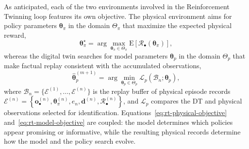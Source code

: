 \documentclass[journal]{IEEEtran}
\begin{document}
As anticipated, each of the two environments involved in the Reinforcement Twinning loop features its own objective. The physical environment aims for policy parameters $\boldsymbol{\theta}_{\pi}$ in the domain $\Theta_{\pi}$ that maximize the expected physical reward,
\begin{equation}
\boldsymbol{\theta}_{\pi}^{\star}
=\arg\max_{\boldsymbol{\theta}_{\pi}\in\Theta_{\pi}}
\mathrm{E}\!\left[\mathcal R_{\bullet}
(\boldsymbol{\theta}_{\pi})\right],
\label{eq:rt-physical-objective}
\end{equation}
whereas the digital twin searches for model parameters $\boldsymbol{\theta}_{p}$  in the domain $\Theta_{p}$ that make factual replay consistent with the accumulated observations,
\begin{equation}
\widehat{\boldsymbol{\theta}}_{p}^{(m+1)}
=\arg\min_{\boldsymbol{\theta}_{p}\in\Theta_p}
\mathcal L_p\!\left(
\mathcal B_n;\boldsymbol{\theta}_{p}
\right),
\label{eq:rt-model-objective}
\end{equation}
where $\mathcal B_n=\{\mathcal E^{(1)},\ldots,\mathcal E^{(n)}\}$ is the replay buffer of physical episode records
$
\mathcal{E}^{(n)} = \left\{
\boldsymbol{o}_{\bullet}^{(n)},
\boldsymbol{\theta}_{\pi}^{(n)},
e_n,
\mathbf d^{(n)},
\mathcal{R}_{\bullet}^{(n)}
\right\}$,
and $\mathcal{L}_p$ compares the DT and physical observations selected for identification. Equations~\eqref{eq:rt-physical-objective} and~\eqref{eq:rt-model-objective} are coupled: the model determines which policies appear promising or informative, while the resulting physical records determine how the model and the policy search evolve.
\end{document}
